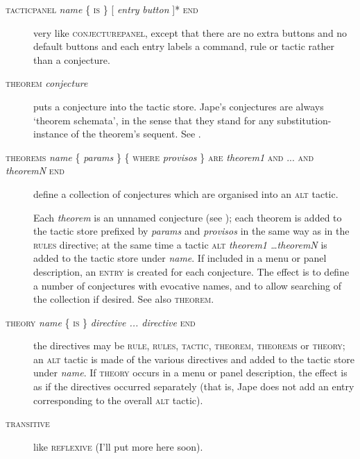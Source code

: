 \begin{description}
\item[\textsc{tacticpanel} \textit{name} \{ \textsc{is} \} \textsc{[} \textit{entry} {\textbar} \textit{button} \textsc{]}* \textsc{end}] very like \textsc{conjecturepanel}, except that there are no extra buttons and no default buttons and each entry labels a command, rule or tactic rather than a conjecture. %

\item[\textsc{theorem} \textit{conjecture}] puts a conjecture into the tactic store. Jape's conjectures are always `theorem schemata', in the sense that they stand for any substitution-instance of the theorem's sequent. See .

\item[\textsc{theorems} \textit{name} \{ \textit{params} \} \{ \textsc{where} \textit{provisos} \} \textsc{are} \textit{theorem1} \textsc{and} ... \textsc{and} \textit{theoremN} \textsc{end}] define a collection of conjectures which are organised into an \textsc{alt} tactic.

Each \textit{theorem} is an unnamed conjecture (see ); each theorem is added to the tactic store prefixed by \textit{params} and \textit{provisos} in the same way as in the \textsc{rules} directive; at the same time a tactic \textsc{alt} \textit{theorem1 \dots theoremN} is added to the tactic store under \textit{name}. If included in a menu or panel description, an \textsc{entry} is created for each conjecture. The effect is to define a number of conjectures with evocative names, and to allow searching of the collection if desired. See also \textsc{theorem}.

\item[\textsc{theory} \textit{name} \{ \textsc{is} \} \textit{directive ... directive} \textsc{end}] the directives may be \textsc{rule, rules, tactic, theorem, theorems} or \textsc{theory}; an \textsc{alt} tactic is made of the various directives and added to the tactic store under \textit{name}. If \textsc{theory} occurs in a menu or panel description, the effect is as if the directives occurred separately (that is, Jape does not add an entry corresponding to the overall \textsc{alt} tactic).

\item[\textsc{transitive}] like \textsc{reflexive} (I'll put more here soon).


\end{description}
